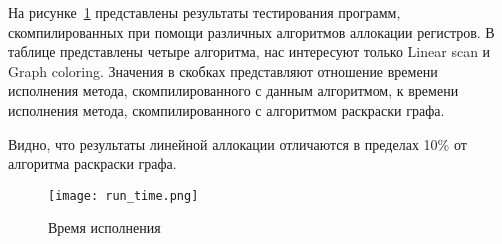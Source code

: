 На рисунке~\ref{fig:run_time} представлены результаты тестирования программ,
скомпилированных при помощи различных алгоритмов аллокации регистров.
В таблице представлены четыре алгоритма, нас интересуют только Linear scan и Graph coloring.
Значения в скобках представляют отношение времени исполнения метода,
скомпилированного с данным алгоритмом, к времени исполнения метода,
скомпилированного с алгоритмом раскраски графа.

Видно, что результаты линейной аллокации отличаются в пределах 10\%
от алгоритма раскраски графа.

\begin{figure}[h]
	\texttt{[image: run\_time.png]}
	\caption{Время исполнения}
	\label{fig:run_time}
\end{figure}


